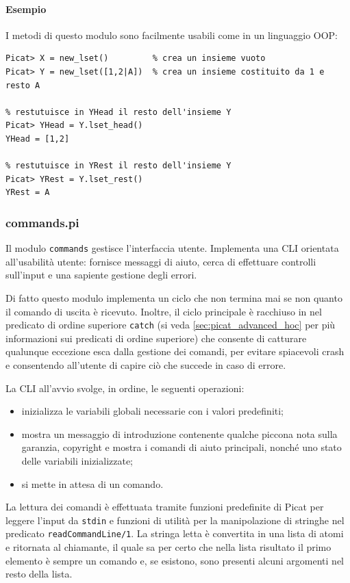 \documentclass[12pt,a4paper,openright]{book} %
\begin{document}
\paragraph{Esempio}

I metodi di questo modulo sono facilmente usabili come in un linguaggio OOP:
\begin{verbatim}
Picat> X = new_lset()         % crea un insieme vuoto
Picat> Y = new_lset([1,2|A])  % crea un insieme costituito da 1 e resto A

% restutuisce in YHead il resto dell'insieme Y
Picat> YHead = Y.lset_head()
YHead = [1,2]

% restutuisce in YRest il resto dell'insieme Y
Picat> YRest = Y.lset_rest()
YRest = A
\end{verbatim}


\subsubsection{commands.pi}

Il modulo \texttt{commands} gestisce l'interfaccia utente. Implementa una CLI orientata all'usabilità utente: fornisce messaggi di aiuto, cerca di effettuare controlli sull'input e una sapiente gestione degli errori.

Di fatto questo modulo implementa un ciclo che non termina mai se non quanto il comando di uscita è ricevuto. Inoltre, il ciclo principale è racchiuso in nel predicato di ordine superiore \texttt{catch} (si veda \ref{sec:picat_advanced_hoc} per più informazioni sui predicati di ordine superiore) che consente di catturare qualunque eccezione esca dalla gestione dei comandi, per evitare spiacevoli crash e consentendo all'utente di capire ciò che succede in caso di errore.

La CLI all'avvio svolge, in ordine, le seguenti operazioni:
\begin{itemize}
	\item inizializza le variabili globali necessarie con i valori predefiniti;
	\item mostra un messaggio di introduzione contenente qualche piccona nota sulla garanzia, copyright e mostra i comandi di aiuto principali, nonché uno stato delle variabili inizializzate;
	\item si mette in attesa di un comando.
\end{itemize}

La lettura dei comandi è effettuata tramite funzioni predefinite di Picat per leggere l'input da \texttt{stdin} e funzioni di utilità per la manipolazione di stringhe nel predicato \texttt{readCommandLine/1}. La stringa letta è convertita in una lista di atomi e ritornata al chiamante, il quale sa per certo che nella lista risultato il primo elemento è sempre un comando e, se esistono, sono presenti alcuni argomenti nel resto della lista.
\end{document}
